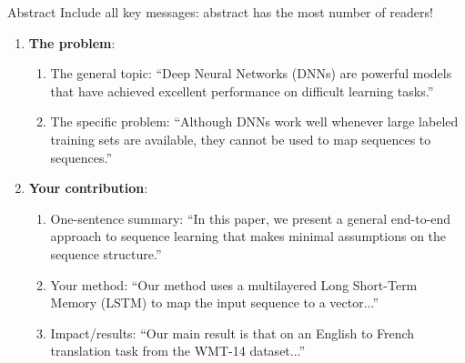\documentclass[usenames,dvipsnames,11pt,aspectratio=169]{beamer}
\begin{document}
\begin{frame}
    {Abstract}
        Include all key messages: abstract has the most number of readers! \\
            \begin{enumerate}
                \item \textbf{The problem}:
                    \begin{enumerate}
                        \item The general topic: {\footnotesize``Deep Neural Networks (DNNs) are powerful models that have achieved excellent performance on difficult learning tasks.''}\\
                        \item The specific problem: {\footnotesize ``Although DNNs work well whenever large labeled training sets are available, they cannot be used to map sequences to sequences.''}
                    \end{enumerate}
                \item \textbf{Your contribution}: \\
                    \begin{enumerate}
                        \item One-sentence summary: {\footnotesize``In this paper, we present a general end-to-end approach to sequence learning that makes minimal assumptions on the sequence structure.''}\\
                        \item Your method: {\footnotesize ``Our method uses a multilayered Long Short-Term Memory (LSTM) to map the input sequence to a vector...''}\\
                        \item Impact/results: {\footnotesize ``Our main result is that on an English to French translation task from the WMT-14 dataset...''}
                    \end{enumerate}
            \end{enumerate}
\end{frame}
\end{document}
